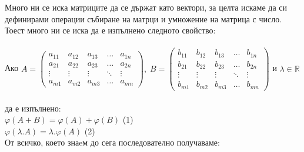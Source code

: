 \documentclass[12pt]{article}
\newcommand{\R}{\mathbb{R}}
\begin{document}
Много ни се иска матриците да се държат като вектори, за целта искаме да си дефинирами операции събиране на матрци и умножение на матрица с число.
Тоест много ни се иска да е изпълнено следното свойство: \\\\

Ако $A = \begin{pmatrix}
    a_{11} & a_{12} & a_{13} & \dots  & a_{1n} \\
    a_{21} & a_{22} & a_{23} & \dots  & a_{2n} \\
    \vdots & \vdots & \vdots & \ddots & \vdots \\
    a_{m1} & a_{m2} & a_{m3} & \dots  & a_{mn}
\end{pmatrix}, \; B = \begin{pmatrix}
    b_{11} & b_{12} & b_{13} & \dots  & b_{1n} \\
    b_{21} & b_{22} & b_{23} & \dots  & b_{2n} \\
    \vdots & \vdots & \vdots & \ddots & \vdots \\
    b_{m1} & b_{m2} & b_{m3} & \dots  & b_{mn}
\end{pmatrix}$ и $\lambda \in \R$\\\\

да е изпълнено: \\
$\varphi(A + B) = \varphi(A) + \varphi(B)$ (1) \\
$\varphi(\lambda.A) = \lambda.\varphi(A)$ (2) \\

От всичко, което знаeм до сега последователно получаваме: \\
\end{document}
